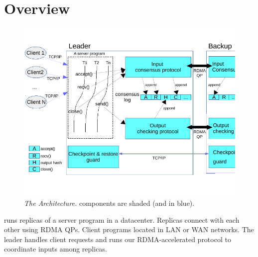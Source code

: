 

\section{\xxx Overview}\label{sec:overview}

\begin{figure}[t]
\centering
\vspace{-.15in}
\includegraphics[width=.48\textwidth]{figures/arch}
\vspace{-.50in}
\caption{{\em The \xxx Architecture.} \xxx components are shaded (and in
  blue).}
\vspace{-.15in}
  \label{fig:arch}
\end{figure}


 





\xxx runs replicas of a server program in a datacenter. Replicas connect with 
each other using RDMA QPs. Client programs located in LAN or WAN networks. The 
leader handles client requests and runs our RDMA-accelerated \paxos protocol to 
coordinate inputs among replicas.


